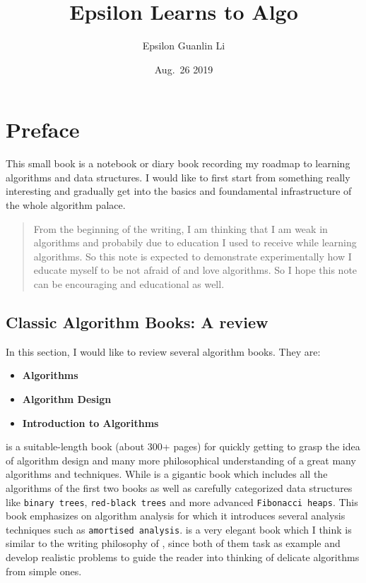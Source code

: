 \documentclass[]{book}
\title{Epsilon Learns to Algo}
\author{Epsilon Guanlin Li}
\date{Aug.~26 2019}
\providecommand{\tightlist}{%
  \setlength{\itemsep}{0pt}\setlength{\parskip}{0pt}}
\begin{document}
\maketitle

{
\setcounter{tocdepth}{1}
\tableofcontents
}
\hypertarget{preface}{%
\chapter*{Preface}\label{preface}}

This small book is a notebook or diary book recording my roadmap to
learning algorithms and data structures. I would like to first start
from something really interesting and gradually get into the basics
and foundamental infrastructure of the whole algorithm palace.

\begin{quote}
From the beginning of the writing, I am thinking that I am weak in
algorithms and probabily due to education I used to receive while learning
algorithms. So this note is expected to demonstrate experimentally how I educate
myself to be not afraid of and love algorithms. So I hope this note
can be encouraging and educational as well.
\end{quote}

\hypertarget{classic-algorithm-books-a-review}{%
\section*{Classic Algorithm Books: A review}\label{classic-algorithm-books-a-review}}

In this section, I would like to review several algorithm books. They are:

\begin{itemize}
\tightlist
\item
  \textbf{Algorithms} \citep{Dasgupta:2006:ALG:1177299}
\item
  \textbf{Algorithm Design} \citep{Kleinberg:2005:AD:1051910}
\item
  \textbf{Introduction to Algorithms} \citep{Cormen:2009:IAT:1614191}
\end{itemize}

\citet{Dasgupta:2006:ALG:1177299} is a suitable-length book (about 300+ pages) for
quickly getting to grasp the idea of algorithm design and many more
philosophical understanding of a great many algorithms and techniques.
While \citet{Cormen:2009:IAT:1614191} is a gigantic book which includes all the
algorithms of the first two books as well as carefully categorized data
structures like \texttt{binary\ trees}, \texttt{red-black\ trees} and more advanced \texttt{Fibonacci\ heaps}. This book emphasizes on algorithm analysis for which it introduces
several analysis techniques such as \texttt{amortised\ analysis}.
\citet{Kleinberg:2005:AD:1051910} is a very elegant book which I think is similar
to the writing philosophy of \citet{Dasgupta:2006:ALG:1177299}, since both of them
task as example and develop realistic problems to guide the reader into
thinking of delicate algorithms from simple ones.
\end{document}
